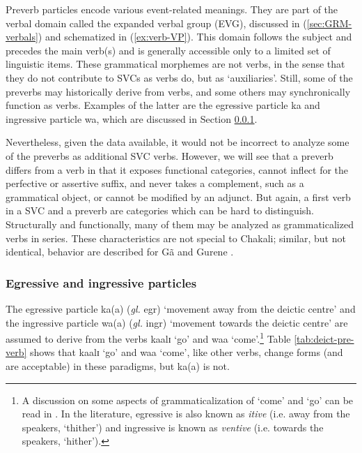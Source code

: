 \begin{exe}
\begin{exe}
\begin{exe}
{\begin{exe}
\begin{exe}
\begin{exe}
\begin{exe}
\begin{exe}
\begin{exe}
\begin{exe}
\begin{exe}
\begin{exe}
\begin{exe}
\begin{exe}
\begin{exe}
\begin{exe}
\begin{exe}
\begin{exe}
\begin{exe}
\begin{exe}
\begin{exe}
\begin{exe}
Preverb particles  encode various event-related
meanings. They are part of the verbal domain  called the expanded verbal group
(EVG), discussed in (\ref{sec:GRM-verbals}) and schematized in  
(\ref{ex:verb-VP}). This domain  follows the 
subject and precedes the main verb(s) and is generally accessible  only to a 
limited set of linguistic items. These grammatical morphemes are
not verbs, in the sense that they do not contribute to SVCs as verbs do,  but as
`auxiliaries'. Still,  some of the preverbs may historically derive from verbs, 
and  some others may synchronically function as verbs.  Examples of the latter
are the egressive particle {\sls ka} and ingressive particle {\sls wa},  which 
are
discussed in Section \ref{sec:GRM-EVC-egr-ingr}. 

Nevertheless, given the data available,  it would not be incorrect to analyze 
some of the preverbs  as additional SVC verbs.  However, we will see  that a 
preverb differs from a verb in that it exposes functional categories,  cannot 
inflect for the perfective or assertive suffix,  and never takes  a complement, 
such as a grammatical object, or cannot be modified by  an adjunct. But again,  
a first verb in a SVC and a preverb are categories which can be hard to 
distinguish. Structurally and functionally, many of them may be analyzed as 
grammaticalized verbs in series. These characteristics are not special to 
Chakali; similar, but not identical, behavior are described for Gã and Gurene 
\citep{Daku07b, Daku08}.



\subsubsection{Egressive and ingressive particles}
\label{sec:GRM-EVC-egr-ingr}


The egressive particle {\sls ka(a)} ({\it gl.} {\sc egr})   `movement away from
the
deictic centre'  and   the ingressive
particle {\sls wa(a)} ({\it gl.} {\sc ingr})  `movement towards
the deictic centre' are  assumed to derive from the  verbs
{\sls kaalɪ} `go' and  {\sls waa} `come'.\footnote{A discussion on some aspects 
of
grammaticalization of  `come' and `go' can be read in  \citet{Bour92}. In the
literature, egressive  is also known as  {\it itive} (i.e. away from the
speakers,  `thither')  and  ingressive  is  known as {\it ventive} (i.e. towards
the speakers,   `hither'). }  Table
\ref{tab:deict-pre-verb} shows that  {\sls kaalɪ} `go' and {\sls waa} `come',  
like 
other verbs, change forms (and are acceptable) in these paradigms,  but {\sls 
ka(a)}  is  not.



\end{exe}
\end{exe}
\end{exe}
\end{exe}
\end{exe}
\end{exe}
\end{exe}
\end{exe}
\end{exe}
\end{exe}
\end{exe}
\end{exe}
\end{exe}
\end{exe}
\end{exe}
\end{exe}
\end{exe}
\end{exe}
\end{exe}}
\end{exe}
\end{exe}
\end{exe}
